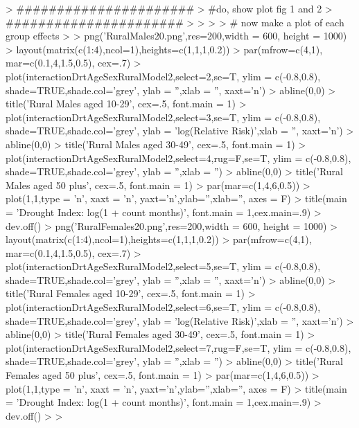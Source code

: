 \documentclass[a4paper]{article}                %
\begin{document}
\begin{Schunk}
\begin{Sinput}
> ######################
> #do,  show plot fig 1 and 2
> ######################
> 
> 
> 
>         # now make a plot of each group effects
> 
>         png('RuralMales20.png',res=200,width = 600, height = 1000)
>         layout(matrix(c(1:4),ncol=1),heights=c(1,1,1,0.2))
>         par(mfrow=c(4,1), mar=c(0.1,4,1.5,0.5), cex=.7)
>         plot(interactionDrtAgeSexRuralModel2,select=2,se=T, ylim = c(-0.8,0.8), shade=TRUE,shade.col='grey', ylab = '',xlab = '', xaxt='n')
>         abline(0,0)
>         title('Rural Males aged 10-29', cex=.5, font.main = 1)
>         plot(interactionDrtAgeSexRuralModel2,select=3,se=T, ylim = c(-0.8,0.8), shade=TRUE,shade.col='grey', ylab = 'log(Relative Risk)',xlab = '', xaxt='n')
>         abline(0,0)
>         title('Rural Males aged 30-49', cex=.5, font.main = 1)
>         plot(interactionDrtAgeSexRuralModel2,select=4,rug=F,se=T, ylim = c(-0.8,0.8), shade=TRUE,shade.col='grey', ylab = '',xlab = '')
>         abline(0,0)
>         title('Rural Males aged 50 plus', cex=.5, font.main = 1)
>         par(mar=c(1,4,6,0.5))
>         plot(1,1,type = 'n', xaxt = 'n', yaxt='n',ylab='',xlab='', axes = F)
>         title(main = 'Drought Index: log(1 + count months)',  font.main = 1,cex.main=.9)
>         dev.off()
>         png('RuralFemales20.png',res=200,width = 600, height = 1000)
>         layout(matrix(c(1:4),ncol=1),heights=c(1,1,1,0.2))
>         par(mfrow=c(4,1), mar=c(0.1,4,1.5,0.5), cex=.7)
>         plot(interactionDrtAgeSexRuralModel2,select=5,se=T, ylim = c(-0.8,0.8), shade=TRUE,shade.col='grey', ylab = '',xlab = '', xaxt='n')
>         abline(0,0)
>         title('Rural Females aged 10-29', cex=.5, font.main = 1)
>         plot(interactionDrtAgeSexRuralModel2,select=6,se=T, ylim = c(-0.8,0.8), shade=TRUE,shade.col='grey', ylab = 'log(Relative Risk)',xlab = '', xaxt='n')
>         abline(0,0)
>         title('Rural Females aged 30-49', cex=.5, font.main = 1)
>         plot(interactionDrtAgeSexRuralModel2,select=7,rug=F,se=T, ylim = c(-0.8,0.8), shade=TRUE,shade.col='grey', ylab = '',xlab = '')
>         abline(0,0)
>         title('Rural Females aged 50 plus', cex=.5, font.main = 1)
>         par(mar=c(1,4,6,0.5))
>         plot(1,1,type = 'n', xaxt = 'n', yaxt='n',ylab='',xlab='', axes = F)
>         title(main = 'Drought Index: log(1 + count months)',  font.main = 1,cex.main=.9)
>         dev.off()
> 
> 
\end{Sinput}
\end{Schunk}
\end{document}
